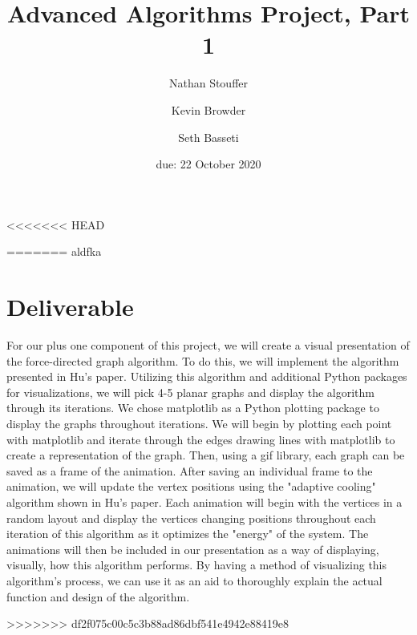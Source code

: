 \documentclass{article}
\title{Advanced Algorithms Project, Part 1}
\author{Nathan Stouffer \and Kevin Browder \and Seth Basseti}
\date{due: 22 October 2020}
\begin{document}
\maketitle

<<<<<<< HEAD


=======
aldfka \cite{hu2005efficient}

\section{Deliverable}
For our plus one component of this project, we will create a visual presentation of the force-directed graph algorithm. 
To do this, we will implement the algorithm presented in Hu's paper. Utilizing this algorithm and additional Python packages for visualizations,
we will pick 4-5 planar graphs and display the algorithm through its iterations. We chose matplotlib as a Python plotting package
to display the graphs throughout iterations. We will begin by plotting each point with matplotlib and iterate through
the edges drawing lines with matplotlib to create a representation of the graph. Then, using a gif library, each graph can be saved as a frame
of the animation. After saving an individual frame to the animation, we will update the vertex positions using the "adaptive cooling" algorithm shown in Hu's paper. 
Each animation will begin with the vertices in a random layout and display the vertices changing positions throughout each iteration of this algorithm
as it optimizes the "energy" of the system. The animations will then be included in our presentation as a way of displaying,
visually, how this algorithm performs. By having a method of visualizing this algorithm's process, we can use it as an aid to
thoroughly explain the actual function and design of the algorithm.

>>>>>>> df2f075c00c5c3b88ad86dbf541e4942e88419e8
\newpage


\end{document}
